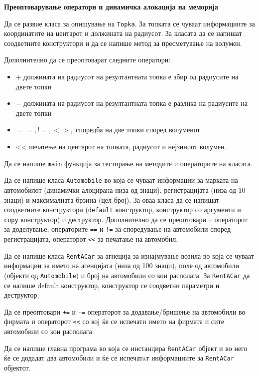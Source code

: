\documentclass[12pt,a4paper]{exam}
\begin{document}
\pagestyle{headandfoot}
\headrule
{}
\begin{center}
\Large{\textbf{Преоптоварување оператори и динамичка алокација на меморија}}
\end{center}
\begin{questions}

\question
Да се развие класа за опишување на \texttt{Topka}. За топката се чуваат
информациите за координатите на центарот и должината на радиусот. За класата да
се напишат соодветните конструктори и да се напише метод за пресметување на
волумен.

Дополнително да се преоптоварат следните оператори:
\begin{itemize}
  \item $+$ должината на радиусот на резултантната топка е збир од радиусите на
  двете топки
  \item $-$ должината на радиусот на резултантната топка е разлика на радиусите на
  двете топки
  \item $==, !=, <>,$ споредба на две топки според волуменот
  \item << печатење на центарот на топката, радиусот и нејзиниот волумен.
\end{itemize}

Да се напише \texttt{main} функција за тестирање на методите и операторите на класата.

\question
Да се напише класа \texttt{Automobile} во која се чуваат информации за марката
на автомобилот (динамички алоцирана низа од знаци), регистрацијата (низа од 10
знаци) и максималната брзина (цел број). За оваа класа да се напишат
соодветните конструктори (\texttt{default} конструктор, конструктор со аргументи и \texttt{copy}
конструктор) и деструктор. Дополнително да се преоптовари \texttt{=} операторот
за доделување, операторите \texttt{==} и \texttt{!=} за споредување на
автомобили според регистрацијата, операторот \texttt{<<} за печатање на автомобил.

Да се напише класа \texttt{RentACar} за агнеција за изнајмување возила во која
се чуваат информации за името на агенцијата (низа од 100 знаци), поле од
автомобили (објекти од \texttt{Automobile}) и број на автомобили со кои располага. 
За \texttt{RentACar} да се напише default конструктор, конструктор се соодветни
параметри и деструктор. 

Да се преоптовари \texttt{+=} и \texttt{-=} операторот за додавање/бришење
на автомобили во фирмата и операторот \texttt{<<} со кој ќе се испечати името на фирмата
и сите автомобили со кои располага. 

Да се напише главна програма во која се
инстанцира \texttt{RentACar} објект и во него ќе се додадат два автомобили и ќе се
испечатaт информациите за \texttt{RentACar} објектот.


\end{questions}
\end{document}
